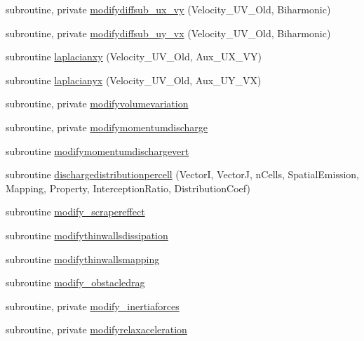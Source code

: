 \begin{DoxyCompactItemize}
\item 
subroutine, private \mbox{\hyperlink{namespacemodulehydrodynamic_a0a591d70830b196d88bbd8d05d6c86f9}{modifydiffsub\+\_\+ux\+\_\+vy}} (Velocity\+\_\+\+U\+V\+\_\+\+Old, Biharmonic)
\item 
subroutine, private \mbox{\hyperlink{namespacemodulehydrodynamic_aa24ecffdbf571df45437d89566a622ae}{modifydiffsub\+\_\+uy\+\_\+vx}} (Velocity\+\_\+\+U\+V\+\_\+\+Old, Biharmonic)
\item 
subroutine \mbox{\hyperlink{namespacemodulehydrodynamic_ace3608af017892be075e4a7361ccedb6}{laplacianxy}} (Velocity\+\_\+\+U\+V\+\_\+\+Old, Aux\+\_\+\+U\+X\+\_\+\+VY)
\item 
subroutine \mbox{\hyperlink{namespacemodulehydrodynamic_a24dd92fa72c14784cca1137f274f1cbd}{laplacianyx}} (Velocity\+\_\+\+U\+V\+\_\+\+Old, Aux\+\_\+\+U\+Y\+\_\+\+VX)
\item 
subroutine, private \mbox{\hyperlink{namespacemodulehydrodynamic_a4d5f643e0f8ee69139183ed0bd4a9482}{modifyvolumevariation}}
\item 
subroutine, private \mbox{\hyperlink{namespacemodulehydrodynamic_af3229a2d204d8a2f73afcb48b571d62e}{modifymomentumdischarge}}
\item 
subroutine \mbox{\hyperlink{namespacemodulehydrodynamic_a3f760d4a01b6aa649a0bc54d3b96ff54}{modifymomentumdischargevert}}
\item 
subroutine \mbox{\hyperlink{namespacemodulehydrodynamic_af887912ae7453edc3375d52c4f6cdfc3}{dischargedistributionpercell}} (VectorI, VectorJ, n\+Cells, Spatial\+Emission, Mapping, Property, Interception\+Ratio, Distribution\+Coef)
\item 
subroutine \mbox{\hyperlink{namespacemodulehydrodynamic_a9f02295d5c7e337e76ec98febfebdc0b}{modify\+\_\+scrapereffect}}
\item 
subroutine \mbox{\hyperlink{namespacemodulehydrodynamic_ae798ddafe12ad94cd6148f8e2658f074}{modifythinwallsdissipation}}
\item 
subroutine \mbox{\hyperlink{namespacemodulehydrodynamic_a70e1f2e2a0b5b92df6a6003db5b51b60}{modifythinwallsmapping}}
\item 
subroutine \mbox{\hyperlink{namespacemodulehydrodynamic_a0305b5a5c3b3ae37a5cbe73fd9fe29c6}{modify\+\_\+obstacledrag}}
\item 
subroutine, private \mbox{\hyperlink{namespacemodulehydrodynamic_abdc575076528a23bb728d486a9919cdf}{modify\+\_\+inertiaforces}}
\item 
subroutine, private \mbox{\hyperlink{namespacemodulehydrodynamic_a2f55960a6b2fdca49570785ed31a7b97}{modifyrelaxaceleration}}

\end{DoxyCompactItemize}
